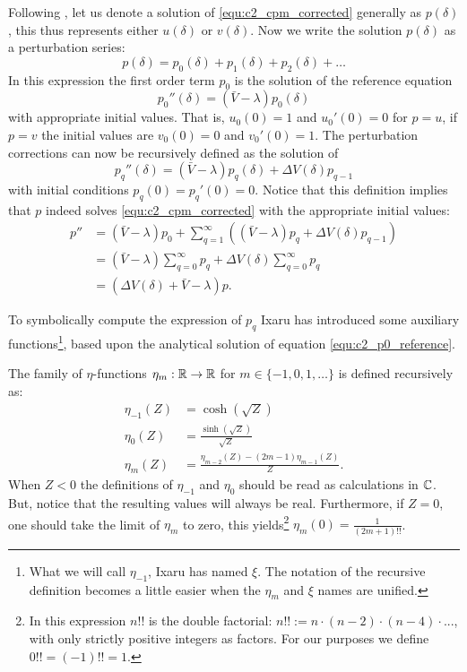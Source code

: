 Following \cite{ixaru_numerical_1984,ixaru_cp_2000}, let us denote a solution of \eqref{equ:c2_cpm_corrected} generally as $p(\delta)$, this thus represents either $u(\delta)$ or $v(\delta)$. Now we write the solution $p(\delta)$ as a perturbation series:
$$
    p(\delta) = p_0(\delta) + p_1(\delta) + p_2(\delta) + \dots
$$
In this expression the first order term $p_0$ is the solution of the reference equation
\begin{equation}\label{equ:c2_p0_reference}
    p_0''(\delta) = (\bar{V} - \lambda) p_0(\delta)
\end{equation}
with appropriate initial values. That is, $u_0(0) = 1$ and $u_0'(0) = 0$ for $p = u$, if $p=v$ the initial values are $v_0(0)=0$ and $v_0'(0) = 1$. The perturbation corrections can now be recursively defined as the solution of
\begin{equation}\label{equ:c2_pq_definition}
    p_q''(\delta) = (\bar{V} - \lambda) p_q(\delta) + \Delta V(\delta) p_{q-1}
\end{equation}
with initial conditions $p_q(0) = p_q'(0) = 0$. Notice that this definition implies that $p$ indeed solves \eqref{equ:c2_cpm_corrected} with the appropriate initial values:
\begin{align*}
    p'' & = (\bar{V} - \lambda)p_0 + \sum_{q=1}^\infty\left((\bar{V} - \lambda)p_q + \Delta V(\delta) p_{q-1}\right) \\
        & = (\bar{V} - \lambda)\sum_{q=0}^\infty p_q + \Delta V(\delta) \sum_{q=0}^\infty p_q                        \\
        & = (\Delta V(\delta) + \bar{V} - \lambda)p\text{.}
\end{align*}

To symbolically compute the expression of $p_q$ Ixaru has introduced some auxiliary functions\footnote{What we will call $\eta_{-1}$, Ixaru has named $\xi$. The notation of the recursive definition becomes a little easier when the $\eta_m$ and $\xi$ names are unified.}, based upon the analytical solution of equation \eqref{equ:c2_p0_reference}.

\begin{definition}[Ixaru 1984]\label{def:c2_eta_functions}
    The family of $\eta$-functions $\eta_m : \mathbb{R} \to \mathbb{R}$ for $m \in \{-1, 0, 1, \dots\}$ is defined recursively as:
    \begin{align*}
        \eta_{-1}(Z) & = \cosh(\sqrt{Z})                                        \\
        \eta_{0}(Z)  & = \frac{\sinh(\sqrt{Z})}{\sqrt{Z}}                       \\
        \eta_{m}(Z)  & = \frac{\eta_{m-2}(Z) - (2m-1) \eta_{m-1}(Z)}{Z}\text{.}
    \end{align*}
    When $Z < 0$ the definitions of $\eta_{-1}$ and $\eta_{0}$ should be read as calculations in $\mathbb{C}$. But, notice that the resulting values will always be real. Furthermore, if $Z = 0$, one should take the limit of $\eta_m$ to zero, this yields\footnote{In this expression $n!!$ is the double factorial: $n!! := n\cdot (n-2) \cdot (n - 4) \cdot ...$, with only strictly positive integers as factors. For our purposes we define $0!! = (-1)!! = 1$.} $\eta_m(0) = \frac{1}{(2m+1)!!}$.
\end{definition}

